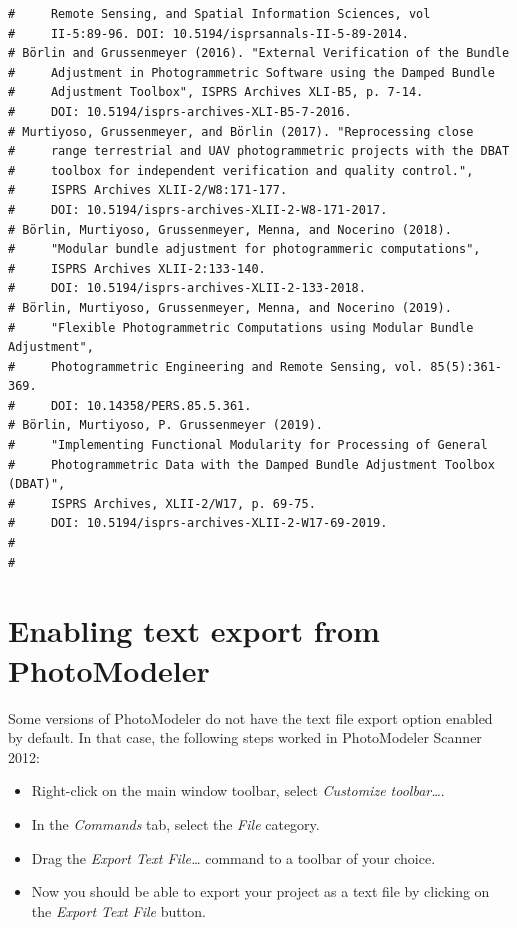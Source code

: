 \documentclass{article}
\begin{document}
\begin{verbatim}
#     Remote Sensing, and Spatial Information Sciences, vol
#     II-5:89-96. DOI: 10.5194/isprsannals-II-5-89-2014.
# Börlin and Grussenmeyer (2016). "External Verification of the Bundle
#     Adjustment in Photogrammetric Software using the Damped Bundle
#     Adjustment Toolbox", ISPRS Archives XLI-B5, p. 7-14.
#     DOI: 10.5194/isprs-archives-XLI-B5-7-2016.
# Murtiyoso, Grussenmeyer, and Börlin (2017). "Reprocessing close
#     range terrestrial and UAV photogrammetric projects with the DBAT
#     toolbox for independent verification and quality control.",
#     ISPRS Archives XLII-2/W8:171-177.
#     DOI: 10.5194/isprs-archives-XLII-2-W8-171-2017.
# Börlin, Murtiyoso, Grussenmeyer, Menna, and Nocerino (2018).
#     "Modular bundle adjustment for photogrammeric computations",
#     ISPRS Archives XLII-2:133-140.
#     DOI: 10.5194/isprs-archives-XLII-2-133-2018.
# Börlin, Murtiyoso, Grussenmeyer, Menna, and Nocerino (2019).
#     "Flexible Photogrammetric Computations using Modular Bundle Adjustment",
#     Photogrammetric Engineering and Remote Sensing, vol. 85(5):361-369.
#     DOI: 10.14358/PERS.85.5.361.
# Börlin, Murtiyoso, P. Grussenmeyer (2019).
#     "Implementing Functional Modularity for Processing of General
#     Photogrammetric Data with the Damped Bundle Adjustment Toolbox (DBAT)",
#     ISPRS Archives, XLII-2/W17, p. 69-75.
#     DOI: 10.5194/isprs-archives-XLII-2-W17-69-2019.
#
#
\end{verbatim}

\section{Enabling text export from PhotoModeler}
\label{sec:enableTextExport}
Some versions of PhotoModeler do not have the text file export option
enabled by default. In that case, the following steps worked in
PhotoModeler Scanner 2012:

\begin{itemize}
\item Right-click on the main window toolbar, select \emph{Customize
toolbar\ldots{}}.
\item In the \emph{Commands} tab, select the \emph{File} category.
\item Drag the \emph{Export Text File\ldots{}} command to a toolbar of your choice.
\item Now you should be able to export your project as a text file by
clicking on the \emph{Export Text File} button.
\end{itemize}
\end{document}
